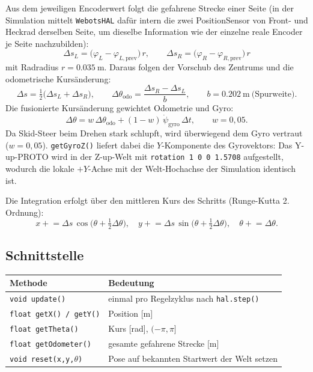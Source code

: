 \documentclass[
  a4paper,
  12pt,
  DIV=12,        %
  parskip=half,  %
  headings=small %
]{scrartcl}
\theoremstyle{definition}
\theoremstyle{definition}
\begin{document}
Aus dem jeweiligen Encoderwert folgt die gefahrene Strecke einer Seite
(in der Simulation mittelt \texttt{WebotsHAL} dafür intern die zwei
PositionSensor von Front- und Heckrad derselben Seite, um dieselbe
Information wie der einzelne reale Encoder je Seite nachzubilden):
\[
\Delta s_L = \big(\varphi_L - \varphi_{L,\mathrm{prev}}\big)\,r,
\qquad
\Delta s_R = \big(\varphi_R - \varphi_{R,\mathrm{prev}}\big)\,r
\]
mit Radradius $r = \SI{0.035}{\meter}$. Daraus folgen der
Vorschub des Zentrums und die odometrische Kursänderung:
\[
\Delta s = \tfrac{1}{2}\big(\Delta s_L + \Delta s_R\big),
\qquad
\Delta\theta_\mathrm{odo} = \frac{\Delta s_R - \Delta s_L}{b},
\qquad b = \SI{0.202}{\meter}\ \text{(Spurweite)}.
\]
Die fusionierte Kursänderung gewichtet Odometrie und Gyro:
\[
\Delta\theta = w\,\Delta\theta_\mathrm{odo}
             + (1-w)\,\dot\psi_\mathrm{gyro}\,\Delta t,
\qquad w = 0{,}05 .
\]
Da Skid-Steer beim Drehen stark schlupft, wird überwiegend dem Gyro
vertraut ($w = 0{,}05$). \texttt{getGyroZ()} liefert dabei die
$Y$-Komponente des Gyrovektors: Das Y-up-PROTO wird in der Z-up-Welt mit
\texttt{rotation 1 0 0 1.5708} aufgestellt, wodurch die lokale
$+Y$-Achse mit der Welt-Hochachse der Simulation identisch ist.

Die Integration erfolgt über den mittleren Kurs des Schritts
(Runge-Kutta 2.\,Ordnung):
\[
x \mathrel{+}= \Delta s\,\cos\!\big(\theta + \tfrac{1}{2}\Delta\theta\big),
\quad
y \mathrel{+}= \Delta s\,\sin\!\big(\theta + \tfrac{1}{2}\Delta\theta\big),
\quad
\theta \mathrel{+}= \Delta\theta .
\]

\subsection{Schnittstelle}\label{lokalisierung-schnittstelle}

\begin{longtable}[]{@{}p{}p{}@{}}
\toprule
\textbf{Methode} & \textbf{Bedeutung}\\
\midrule
\endhead
\texttt{void update()} & einmal pro Regelzyklus nach \texttt{hal.step()}\\
\texttt{float getX() / getY()} & Position [m]\\
\texttt{float getTheta()} & Kurs [rad], $(-\pi,\pi]$\\
\texttt{float getOdometer()} & gesamte gefahrene Strecke [m]\\
\texttt{void reset(x,y,\ensuremath{\theta})} & Pose auf bekannten Startwert der Welt setzen\\
\bottomrule
\end{longtable}
\end{document}
